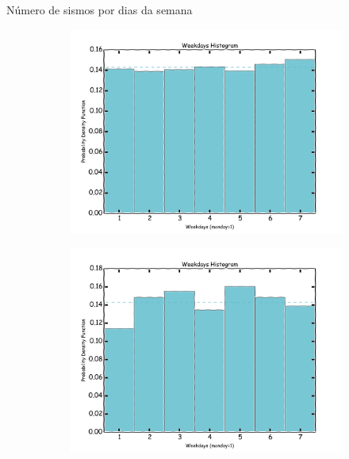 \documentclass[ucs,8pt]{beamer}
\begin{document}
\begin{frame}{Número de sismos por dias da semana}
\begin{figure}[H]
	\centering
	\begin{subfigure}[t]{0.48\textwidth}
		  	\centering
			\includegraphics[width=1.0\textwidth]{hmtk_sa3_weekday}
			\label{fig:sa_week_hist}
	\end{subfigure}%
	\quad %
	\begin{subfigure}[t]{0.48\textwidth}
		  	\centering
			\includegraphics[width=1.0\textwidth]{hmtk_bsb2013_weekday}
			\label{fig:br_week_hist}
    \end{subfigure}%
  \label{fig:qc_histograms} 
\end{figure}
\end{frame}
\end{document}
